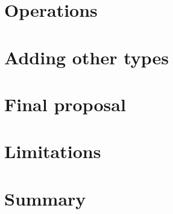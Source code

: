 \begin{defn}[Abstraction]
\end{defn}


\section{Operations}

\section{Adding other types}

\section{Final proposal}

\section{Limitations}


\section*{Summary}
